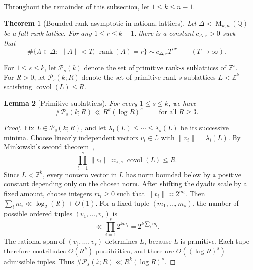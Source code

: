 \documentclass[reqno,11pt]{amsart}
\numberwithin{equation}{section}
\newtheorem{theorem}{Theorem}[section]
\newtheorem{lemma}[theorem]{Lemma}
\theoremstyle{definition}
\theoremstyle{remark}
\newcommand{\op}{\operatorname}
\newcommand{\rank}{\op{rank}}
\newcommand{\M}{\op{M}}
\newcommand{\covol}{\op{covol}}
\begin{document}
Throughout the remainder of this subsection, let $1\le k\le n-1$.
\begin{theorem}[Bounded-rank asymptotic in rational lattices]
\label{rational-lattice}
Let
$\Delta<\M_{k,n}(\mathbb Q)$ be a full-rank lattice. 
For any $1\le r\le k-1$, there is a constant $c_{\Delta,r}>0$ such that
$$
\#\{A\in\Delta:\ \|A\|< T,\ \rank(A)=r\}
\sim
c_{\Delta,r}T^{nr}
\qquad (T\to\infty).
$$
\end{theorem}


For $1\le s\le k$, let $\mathcal P_s(k)$ denote the
set of primitive rank-$s$ sublattices of $\mathbb Z^k$.
For $R>0$, let $\mathcal P_s(k;R)$ denote the set
of primitive rank-$s$ sublattices $L<\mathbb Z^k$ satisfying
$\covol(L)\le R$.
\begin{lemma}[Primitive sublattices]
\label{primitive}
For every $1\le s\le k$, we have
$$
\#\mathcal P_s(k;R)
\ll
R^k(\log R)^s \qquad \text{ for all $R\ge 3$}.
$$
\end{lemma}

\begin{proof}
Fix $L\in\mathcal P_s(k;R)$, and let
$\lambda_1(L)\le\cdots\le\lambda_s(L)$ be its successive minima. Choose
linearly independent vectors $v_i\in L$ with $\|v_i\|=\lambda_i(L)$. By
Minkowski's second theorem~\cite{cassels:1971},
$$
\prod_{i=1}^s\|v_i\|
\asymp_{k,s}
\covol(L)
\le R.
$$
Since $L<\mathbb Z^k$, every nonzero vector in $L$ has norm bounded below
by a positive constant depending only on the chosen norm. After shifting the dyadic scale by a fixed amount, choose integers
$m_i\ge0$ such that $\|v_i\|\asymp 2^{m_i}$. Then
$\sum_i m_i\ll\log_2(R) +O(1)$. For a fixed tuple
$(m_1,\ldots,m_s)$, the number of possible ordered tuples
$(v_1,\ldots,v_s)$ is
$$
\ll
\prod_{i=1}^s2^{km_i}
=
2^{k\sum_i m_i}.
$$
The rational span of $(v_1,\ldots,v_s)$ determines $L$, because $L$ is
primitive. Each tupe therefore contributes $O(R^k)$ possibilities, and there are $O((\log R)^s)$ admissible tuples.
Thus
$
\#\mathcal P_s(k;R)
\ll
R^k(\log R)^s.
$
\end{proof}
\end{document}
